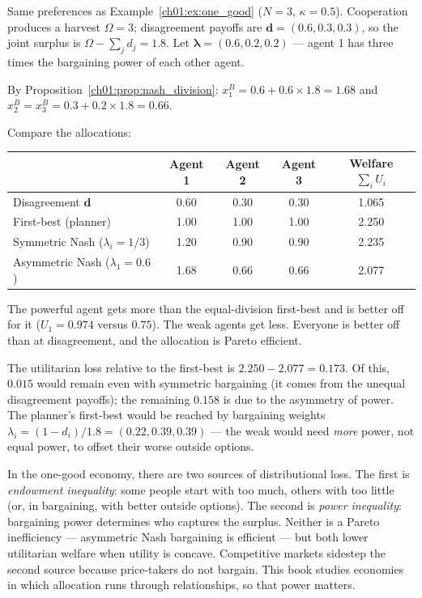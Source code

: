 \documentclass[../structural_economics_book.tex]{subfiles}
\begin{document}
\begin{example}\label{ch01:ex:bargaining}
Same preferences as Example~\ref{ch01:ex:one_good} ($N = 3$, $\kappa = 0.5$). Cooperation produces a harvest $\Omega = 3$; disagreement payoffs are $\mathbf{d} = (0.6, 0.3, 0.3)$, so the joint surplus is $\Omega - \sum_j d_j = 1.8$. Let $\boldsymbol{\lambda} = (0.6, 0.2, 0.2)$ --- agent 1 has three times the bargaining power of each other agent.

By Proposition~\ref{ch01:prop:nash_division}: $x_1^B = 0.6 + 0.6 \times 1.8 = 1.68$ and $x_2^B = x_3^B = 0.3 + 0.2 \times 1.8 = 0.66$.

Compare the allocations:
\begin{center}
\begin{tabular}{lcccc}
\toprule
& Agent 1 & Agent 2 & Agent 3 & Welfare $\sum_i U_i$ \\
\midrule
Disagreement $\mathbf{d}$ & 0.60 & 0.30 & 0.30 & 1.065 \\
First-best (planner) & 1.00 & 1.00 & 1.00 & 2.250 \\
Symmetric Nash ($\lambda_i = 1/3$) & 1.20 & 0.90 & 0.90 & 2.235 \\
Asymmetric Nash ($\lambda_1 = 0.6$) & 1.68 & 0.66 & 0.66 & 2.077 \\
\bottomrule
\end{tabular}
\end{center}

The powerful agent gets more than the equal-division first-best and is better off for it ($U_1 = 0.974$ versus $0.75$). The weak agents get less. Everyone is better off than at disagreement, and the allocation is Pareto efficient.

The utilitarian loss relative to the first-best is $2.250 - 2.077 = 0.173$. Of this, $0.015$ would remain even with symmetric bargaining (it comes from the unequal disagreement payoffs); the remaining $0.158$ is due to the asymmetry of power. The planner's first-best would be reached by bargaining weights $\lambda_i = (1 - d_i)/1.8 = (0.22, 0.39, 0.39)$ --- the weak would need \textit{more} power, not equal power, to offset their worse outside options.
\end{example}

\begin{keyinsight}
In the one-good economy, there are two sources of distributional loss. The first is \textit{endowment inequality}: some people start with too much, others with too little (or, in bargaining, with better outside options). The second is \textit{power inequality}: bargaining power determines who captures the surplus. Neither is a Pareto inefficiency --- asymmetric Nash bargaining is efficient --- but both lower utilitarian welfare when utility is concave. Competitive markets sidestep the second source because price-takers do not bargain. This book studies economies in which allocation runs through relationships, so that power matters.
\end{keyinsight}
\end{document}
